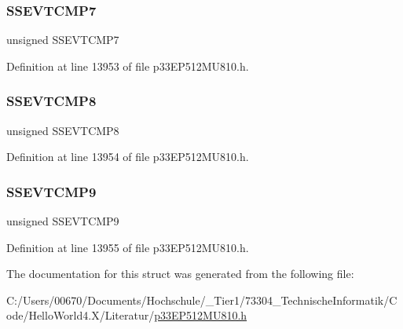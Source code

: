 \subsubsection{\texorpdfstring{S\+S\+E\+V\+T\+C\+M\+P7}{SSEVTCMP7}}
{\footnotesize\ttfamily unsigned S\+S\+E\+V\+T\+C\+M\+P7}



Definition at line 13953 of file p33\+E\+P512\+M\+U810.\+h.

\mbox{\label{structtag_s_s_e_v_t_c_m_p_b_i_t_s_a52060ef9b3d640bf6cfd6447e8aa1418}} 
\subsubsection{\texorpdfstring{S\+S\+E\+V\+T\+C\+M\+P8}{SSEVTCMP8}}
{\footnotesize\ttfamily unsigned S\+S\+E\+V\+T\+C\+M\+P8}



Definition at line 13954 of file p33\+E\+P512\+M\+U810.\+h.

\mbox{\label{structtag_s_s_e_v_t_c_m_p_b_i_t_s_aa89794df07dbd5b60b5637d32812dbf3}} 
\subsubsection{\texorpdfstring{S\+S\+E\+V\+T\+C\+M\+P9}{SSEVTCMP9}}
{\footnotesize\ttfamily unsigned S\+S\+E\+V\+T\+C\+M\+P9}



Definition at line 13955 of file p33\+E\+P512\+M\+U810.\+h.



The documentation for this struct was generated from the following file\+:\begin{DoxyCompactItemize}
\item 
C\+:/\+Users/00670/\+Documents/\+Hochschule/\+\_\+\+Tier1/73304\+\_\+\+Technische\+Informatik/\+Code/\+Hello\+World4.\+X/\+Literatur/\hyperlink{p33_e_p512_m_u810_8h}{p33\+E\+P512\+M\+U810.\+h}\end{DoxyCompactItemize}
